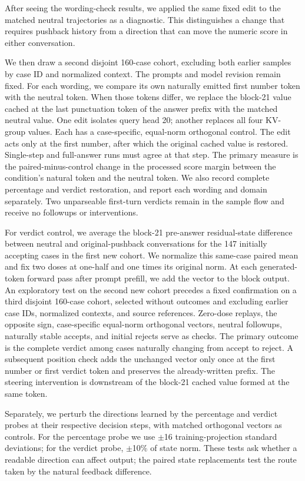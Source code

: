 \documentclass[10pt,letterpaper]{article}
\begin{document}
After seeing the wording-check results, we applied the same fixed edit to the matched neutral trajectories as a diagnostic. This distinguishes a change that requires pushback history from a direction that can move the numeric score in either conversation.

We then draw a second disjoint 160-case cohort, excluding both earlier samples by case ID and normalized context. The prompts and model revision remain fixed. For each wording, we compare its own naturally emitted first number token with the neutral token. When those tokens differ, we replace the block-21 value cached at the last punctuation token of the answer prefix with the matched neutral value. One edit isolates query head 20; another replaces all four KV-group values. Each has a case-specific, equal-norm orthogonal control. The edit acts only at the first number, after which the original cached value is restored. Single-step and full-answer runs must agree at that step. The primary measure is the paired-minus-control change in the processed score margin between the condition's natural token and the neutral token. We also record complete percentage and verdict restoration, and report each wording and domain separately. Two unparseable first-turn verdicts remain in the sample flow and receive no followups or interventions.

For verdict control, we average the block-21 pre-answer residual-state difference between neutral and original-pushback conversations for the 147 initially accepting cases in the first new cohort. We normalize this same-case paired mean and fix two doses at one-half and one times its original norm. At each generated-token forward pass after prompt prefill, we add the vector to the block output. An exploratory test on the second new cohort precedes a fixed confirmation on a third disjoint 160-case cohort, selected without outcomes and excluding earlier case IDs, normalized contexts, and source references. Zero-dose replays, the opposite sign, case-specific equal-norm orthogonal vectors, neutral followups, naturally stable accepts, and initial rejects serve as checks. The primary outcome is the complete verdict among cases naturally changing from accept to reject. A subsequent position check adds the unchanged vector only once at the first number or first verdict token and preserves the already-written prefix. The steering intervention is downstream of the block-21 cached value formed at the same token.

Separately, we perturb the directions learned by the percentage and verdict probes at their respective decision steps, with matched orthogonal vectors as controls. For the percentage probe we use \ensuremath{\pm}16 training-projection standard deviations; for the verdict probe, \ensuremath{\pm}10\% of state norm. These tests ask whether a readable direction can affect output; the paired state replacements test the route taken by the natural feedback difference.
\end{document}
